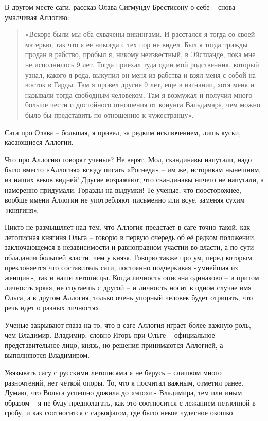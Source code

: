 В другом месте саги, рассказ Олава Сигмунду Брестисону о себе – снова умалчивая Аллогию:

\begin{quotation}
«Вскоре были мы оба схвачены викингами. И расстался я тогда со своей матерью, так что я ее никогда с тех пор не видел. Был я тогда трижды продан в рабство, пробыл я, никому неизвестный, в Эйстланде, пока мне не исполнилось 9 лет. Тогда приехал туда один мой родственник, который узнал, какого я рода, выкупил он меня из рабства и взял меня с собой на восток в Гарды. Там я провел другие 9 лет, еще в  изгнании, хотя меня и называли тогда свободным человеком. Там я возмужал и получил много больше чести и достойного отношения от конунга Вальдамара, чем можно было бы представить по отношению к чужестранцу».
\end{quotation}

Сага про Олава – большая, я привел, за редким исключением, лишь куски, касающиеся Аллогии. 

Что про Аллогию говорят ученые? Не верят. Мол, скандинавы напутали, надо было вместо «Аллогия» всюду писать «Рогнеда» – им же, историкам нынешним, из наших веков видней! Другие возражают, что скандинавы ничего не напутали, а намеренно придумали. Горазды на выдумки! Те ученые, что поосторожнее, вообще имени Аллогии не употребляют письменно или всуе, заменяя сухим «княгиня».

Никто не размышляет над тем, что Аллогия предстает в саге точно такой, как летописная княгиня Ольга – говорю в первую очередь об её редком положении, заключающемся в независимости и равноправном участии во власти, а по сути обладании большей власти, чем у князя. Говорю также про ум, перед которым преклоняется что составитель саги, постоянно подчеркивая «умнейшая из женщин», так и наши летописцы. Когда личность описана одинаково – и притом личность яркая, не спутаешь с другой – и личность носит в одном случае имя Ольга, а в другом Аллогия, только очень упорный человек будет отрицать, что речь идет о разных личностях.

Ученые закрывают глаза на то, что в саге Аллогия играет более важную роль, чем Владимир. Владимир, словно Игорь при Ольге – официальное представительное лицо, князь, но решения принимаются Аллогией, а выполняются Владимиром.

Увязывать сагу с русскими летописями я не берусь – слишком много разночтений, нет четкой опоры. То, что я посчитал важным, отметил ранее. Думаю, что Вольга успешно дожила до «эпохи» Владимира, тем или иным образом – я не буду предполагать, как это соотносится с лежанием нетленной в гробу, и как соотносится с саркофагом, где было некое чудесное окошко.

